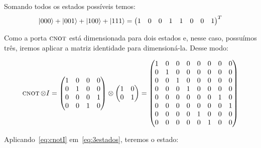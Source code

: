 Somando todos os estados possíveis temos:
\begin{equation}\label{eq:3estados}
\ket{000}+\ket{001}+\ket{100}+\ket{111}= \begin{pmatrix}
1 & 0 & 0 & 1 & 1 & 0 & 0 & 1
\end{pmatrix}^T
\end{equation}

Como a porta \(\operatorname{\textsc{cnot}}\) está dimensionada para dois estados e, nesse caso, possuímos três, iremos aplicar a matriz identidade para dimensioná-la. Desse modo:

\begin{equation}\label{eq:cnotI}
\operatorname{\textsc{cnot}} \otimes I = \begin{pmatrix}
		1 & 0 & 0 & 0 \\
		0 & 1 & 0 & 0 \\
		0 & 0 & 0 & 1 \\
		0 & 0 & 1 & 0
		\end{pmatrix} \otimes \begin{pmatrix}
		1 & 0 \\
		0 & 1
		\end{pmatrix} = \begin{pmatrix}
		1 & 0 & 0 & 0 & 0 & 0 & 0 & 0 \\
		0 & 1 & 0 & 0 & 0 & 0 & 0 & 0 \\
		0 & 0 & 1 & 0 & 0 & 0 & 0 & 0 \\
		0 & 0 & 0 & 1 & 0 & 0 & 0 & 0 \\
		0 & 0 & 0 & 0 & 0 & 0 & 1 & 0 \\
		0 & 0 & 0 & 0 & 0 & 0 & 0 & 1 \\
		0 & 0 & 0 & 0 & 1 & 0 & 0 & 0 \\
		0 & 0 & 0 & 0 & 0 & 1 & 0 & 0 		
		\end{pmatrix}
\end{equation}

Aplicando~\eqref{eq:cnotI} em~\eqref{eq:3estados}, teremos o estado:

